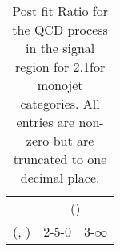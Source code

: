 \begin{table}[h!]
\tiny
\centering
\caption{Post fit Ratio for the QCD process in the signal region for 2.1\ifb for monojet categories. All entries are non-zero but are truncated to one decimal place.\label{tab:ratioseppost_sig_qcd_mono}}
\begin{tabular}
{ccc}
	\hline\hline
	& \multicolumn{2}{c}{\scalht (\gev)} \\ 
	 (\njet,  \nb) & 2-5-0 & 3-$\infty$ \\ [0.8ex] 
\hline
	\hline
	\hline
\end{tabular}
\end{table}
